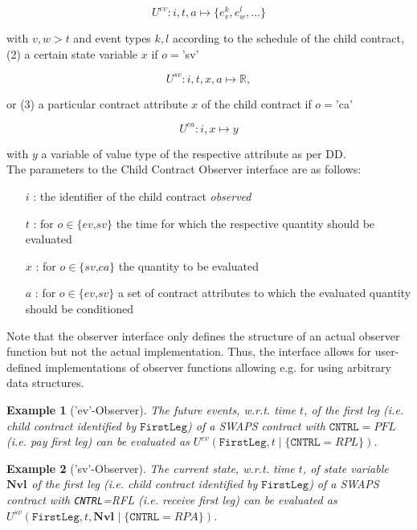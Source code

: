 \documentclass[9pt,oneside]{amsart}
\newtheorem{example}{Example}
\newcommand{\Real}{\mathbb{R}}
\newcommand{\svar}[2]{\textbf{#1}_{#2}}
\newcommand{\attr}[1]{\texttt{#1}}
\newcommand{\cldev}[3]{U^{ev}(\texttt{#1},#2 \mid\{#3\})}
\newcommand{\cldsv}[4]{U^{sv}(\texttt{#1},#2,\svar{#3}{} \mid\{#4\})}
\newcommand{\cldfunc}[1]{U^{#1}}
\begin{document}
\begin{multicols}{2}
\[
	\cldfunc{ev}: i,t,a \mapsto \{e_v^{k},e_w^{l},...\}
\]

with $v,w>t$ and event types $k,l$ according to the schedule of the child contract, (2) a certain state variable $x$ if $o=$'sv'

\[
	\cldfunc{sv}: i,t,x,a \mapsto \Real,
\]

or (3) a particular contract attribute $x$ of the child contract if $o=$'ca'

\[
	\cldfunc{ca}: i,x \mapsto y
\]

with $y$ a variable of value type of the respective attribute as per DD.\\

The parameters to the Child Contract Observer interface are as follows:

\begin{itemize}
	\item[$i$]: the identifier of the child contract \textit{observed}

	\item[$t$]: for $o\in\{\textit{ev,sv}\}$ the time for which the respective quantity should be evaluated

	\item [$x$]: for $o\in\{\textit{sv,ca}\}$ the quantity to be evaluated

	\item [$a$]: for $o\in\{\textit{ev,sv}\}$ a set of contract attributes to which the evaluated quantity should be conditioned
\end{itemize}


Note that the observer interface only defines the structure of an actual observer function but not the actual implementation. Thus, the interface allows for user-defined implementations of observer functions allowing e.g. for using arbitrary data structures.

\begin{example}['ev'-Observer] The future events, w.r.t. time $t$, of the \textit{first leg} (i.e. child contract identified by $\texttt{FirstLeg}$) of a SWAPS contract with $\attr{CNTRL}=PFL$ (i.e. \textit{pay first leg}) can be evaluated as $\cldev{FirstLeg}{t}{\attr{CNTRL}=RPL}$.
\end{example}

\begin{example}['sv'-Observer] The current state, w.r.t. time $t$, of state variable $\svar{Nvl}{}$ of the \textit{first leg} (i.e. child contract identified by $\texttt{FirstLeg}$) of a SWAPS contract with \attr{CNTRL}=RFL (i.e. \textit{receive first leg}) can be evaluated as $\cldsv{FirstLeg}{t}{Nvl}{\attr{CNTRL}=RPA}$.
\end{example}


\end{multicols}
\end{document}
